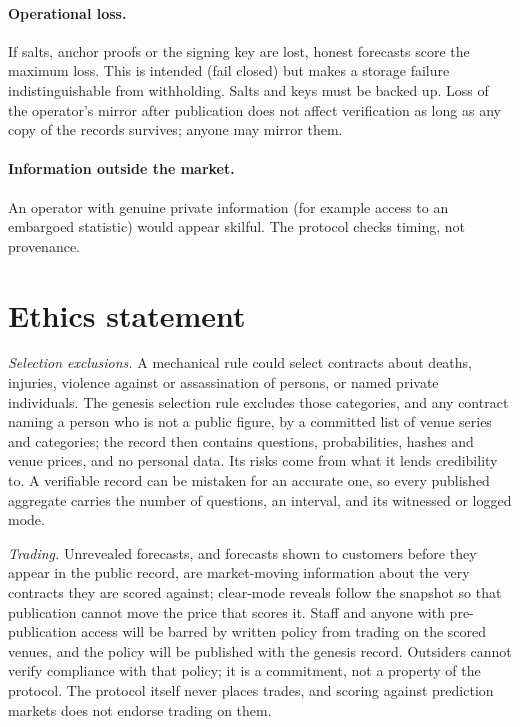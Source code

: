 \documentclass[11pt]{article}
\begin{document}
\paragraph{Operational loss.} If salts, anchor proofs or the signing key are lost, honest forecasts score the maximum loss. This is intended (fail closed) but makes a storage failure indistinguishable from withholding. Salts and keys must be backed up. Loss of the operator's mirror after publication does not affect verification as long as any copy of the records survives; anyone may mirror them.

\paragraph{Information outside the market.} An operator with genuine private information (for example access to an embargoed statistic) would appear skilful. The protocol checks timing, not provenance.

\section{Ethics statement}
\label{sec:ethics}

\emph{Selection exclusions.} A mechanical rule could select contracts about deaths, injuries, violence against or assassination of persons, or named private individuals. The genesis selection rule excludes those categories, and any contract naming a person who is not a public figure, by a committed list of venue series and categories; the record then contains questions, probabilities, hashes and venue prices, and no personal data. Its risks come from what it lends credibility to. A verifiable record can be mistaken for an accurate one, so every published aggregate carries the number of questions, an interval, and its witnessed or logged mode.

\emph{Trading.} Unrevealed forecasts, and forecasts shown to customers before they appear in the public record, are market-moving information about the very contracts they are scored against; clear-mode reveals follow the snapshot so that publication cannot move the price that scores it. Staff and anyone with pre-publication access will be barred by written policy from trading on the scored venues, and the policy will be published with the genesis record. Outsiders cannot verify compliance with that policy; it is a commitment, not a property of the protocol. The protocol itself never places trades, and scoring against prediction markets does not endorse trading on them.
\end{document}
